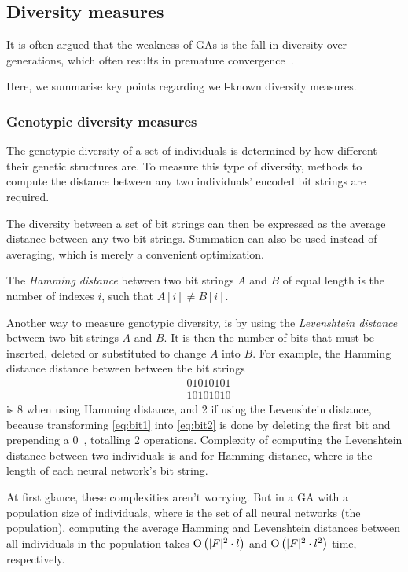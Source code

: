 \subsection{Diversity measures}
\label{sec:diversitymeasures}
It is often argued that the weakness of GAs is the fall in diversity over generations, which often results in premature convergence~\cite{diaz2007empirical, 1266373,Zitzler00comparisonof}.

Here, we summarise key points regarding well-known diversity measures. %

\subsubsection{Genotypic diversity measures}
The genotypic diversity of a set of individuals is determined by how different their genetic structures are. To measure this type of diversity, methods to compute the distance between any two individuals' encoded bit strings are required.

The diversity between a set of bit strings can then be expressed as the average distance between any two bit strings. Summation can also be used instead of averaging, which is merely a convenient optimization.

The \emph{Hamming distance} between two bit strings $A$ and $B$ of equal length is the number of indexes $i$, such that $A[i] \neq B[i]$.

Another way to measure genotypic diversity, is by using the \emph{Levenshtein distance} between two bit strings $A$ and $B$. It is then the number of bits that must be inserted, deleted or substituted to change $A$ into $B$. For example, the Hamming distance distance between between the bit strings
%
\begin{align}
&01010101\label{eq:bit1} \\
&10101010\label{eq:bit2}
\end{align}
%
is 8 when using Hamming distance, and 2 if using the Levenshtein distance, because transforming \cref{eq:bit1} into \cref{eq:bit2} is done by deleting the first bit and prepending a $0$~\cite{1250187}, totalling 2 operations. Complexity of computing the Levenshtein distance between two individuals is  and \bigO{\bitstringl} for Hamming distance, where \bitstringl{} is the length of each neural network's bit string.

At first glance, these complexities aren't worrying. But in a GA with a population size of \indsetl{} individuals, where \indset{} is the set of all neural networks (the population), computing the average Hamming and Levenshtein distances between all individuals in the population takes $\operatorname{O}\left(\lvert F\rvert^2 \cdot l\right)$ and $\operatorname{O}\left(\lvert F\rvert^2 \cdot l^2\right)$ time, respectively. 

